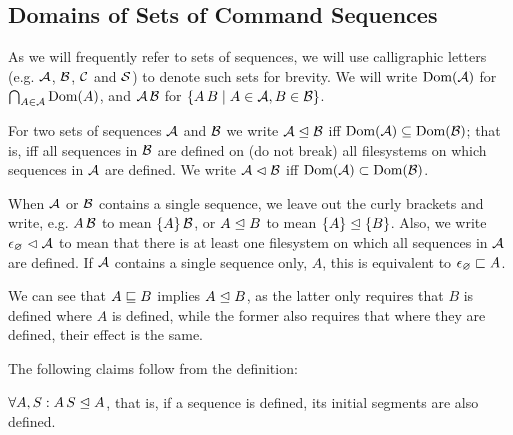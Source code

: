 

\subsection{Domains of Sets of Command Sequences}

\begin{mydef}
As we will frequently refer to sets of sequences,
we will use calligraphic letters (e.g. $\mathcal{A}$, $\mathcal{B}$, $\mathcal{C}$ and $\mathcal{S}$)
to denote such sets for brevity.
We will write $\textrm{Dom}({\mathcal{A}})$ for $\bigcap_{A\in\mathcal{A}} \textrm{Dom}({A})$,
and $\mathcal{A}\,\mathcal{B}$ for $\{A\, B\mathrel{|} A\in\mathcal{A}, B\in\mathcal{B}\}$.
\end{mydef}


\begin{mydef}[$\worksmeqsign$]
For two sets of sequences $\mathcal{A}$ and $\mathcal{B}$
we write ${\mathcal{A}}\trianglelefteq{\mathcal{B}}$ iff $\textrm{Dom}({\mathcal{A}}) \subseteq \textrm{Dom}({\mathcal{B}})$;
that is, iff all sequences in $\mathcal{B}$ are defined on (do not break)
all filesystems on which sequences in $\mathcal{A}$ are defined.
We write $\mathcal{A}\vartriangleleft\mathcal{B}$ iff $\textrm{Dom}({\mathcal{A}}) \subset \textrm{Dom}({\mathcal{B}})$.
\end{mydef}

When $\mathcal{A}$ or $\mathcal{B}$ contains a single sequence,
we leave out the curly brackets and write,
e.g. $A\,\mathcal{B}$ to mean $\{A\}\,\mathcal{B}$,
or ${A}\trianglelefteq{B}$ to mean ${\{{A}\}}\trianglelefteq{\{{B}\}}$.
Also, we write ${\epsilon_\varnothing}\vartriangleleft{\mathcal{A}}$ to mean that
there is at least one filesystem on which all sequences in $\mathcal{A}$ are defined.
If $\mathcal{A}$ contains a single sequence only, $A$, this is equivalent to $\epsilon_\varnothing\sqsubset{A}$.

We can see that $A\sqsubseteq B$ implies ${A}\trianglelefteq{B}$, as the latter
only requires that $B$ is defined where $A$ is defined, 
while the former also requires
that where they are defined, their effect is the same.

The following claims follow from the definition:

\begin{myclm}
$\forall A,S: {A\, S}\trianglelefteq{A}$, that is, if a sequence is defined,
its initial segments are also defined.
\end{myclm}

